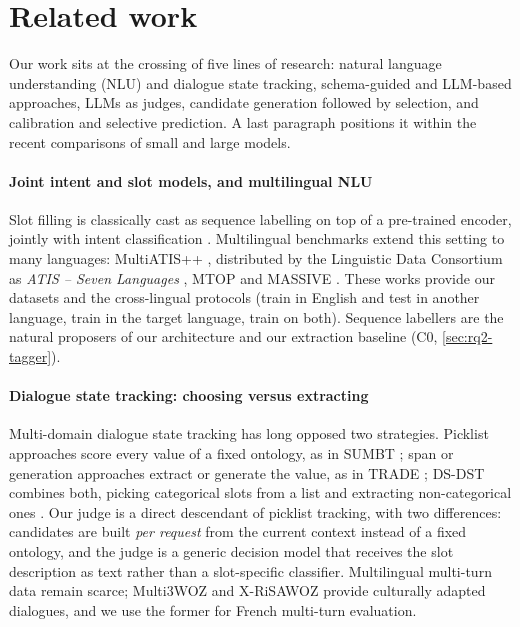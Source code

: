 \section{Related work}
\label{sec:related}

Our work sits at the crossing of five lines of research: natural language understanding (NLU) and dialogue state tracking, schema-guided and LLM-based approaches, LLMs as judges, candidate generation followed by selection, and calibration and selective prediction. A last paragraph positions it within the recent comparisons of small and large models.

\paragraph{Joint intent and slot models, and multilingual NLU}
Slot filling is classically cast as sequence labelling on top of a pre-trained encoder, jointly with intent classification \citep{chen2019jointbert}. Multilingual benchmarks extend this setting to many languages: MultiATIS++ \citep{xu2020multiatis}, distributed by the Linguistic Data Consortium as \emph{ATIS -- Seven Languages} \citep{mansour2021atis7}, MTOP \citep{li2021mtop} and MASSIVE \citep{fitzgerald2023massive}. These works provide our datasets and the cross-lingual protocols (train in English and test in another language, train in the target language, train on both). Sequence labellers are the natural proposers of our architecture and our extraction baseline (C0, \cref{sec:rq2-tagger}).

\paragraph{Dialogue state tracking: choosing versus extracting}
Multi-domain dialogue state tracking has long opposed two strategies. Picklist approaches score every value of a fixed ontology, as in SUMBT \citep{lee2019sumbt}; span or generation approaches extract or generate the value, as in TRADE \citep{wu2019trade}; DS-DST combines both, picking categorical slots from a list and extracting non-categorical ones \citep{zhang2020dsdst}. Our judge is a direct descendant of picklist tracking, with two differences: candidates are built \emph{per request} from the current context instead of a fixed ontology, and the judge is a generic decision model that receives the slot description as text rather than a slot-specific classifier. Multilingual multi-turn data remain scarce; Multi3WOZ \citep{hu2023multi3woz} and X-RiSAWOZ \citep{moradshahi2023xrisawoz} provide culturally adapted dialogues, and we use the former for French multi-turn evaluation.

